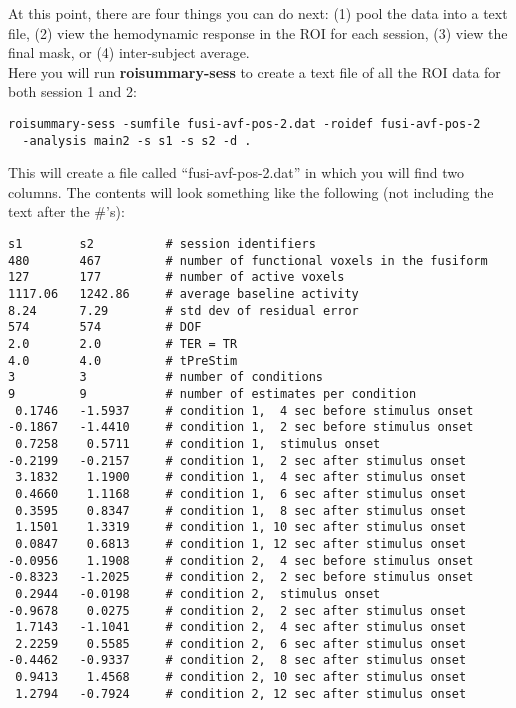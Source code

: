 \documentclass[10pt]{article}
\begin{document}
At this point, there are four things you can do next: (1) pool the
data into a text file, (2) view the hemodynamic response in the ROI
for each session, (3) view the final mask, or (4) inter-subject
average. \\

 Here you will run
{\bf roisummary-sess} to create a text file of all the ROI data for
both session 1 and 2:
\begin{verbatim}
roisummary-sess -sumfile fusi-avf-pos-2.dat -roidef fusi-avf-pos-2 
  -analysis main2 -s s1 -s s2 -d .
\end{verbatim}
This will create a file called ``fusi-avf-pos-2.dat'' in which you
will find two columns.  The contents will look something like the
following (not including the text after the \#'s): 
\begin{verbatim}
s1        s2          # session identifiers
480       467         # number of functional voxels in the fusiform
127       177         # number of active voxels
1117.06   1242.86     # average baseline activity
8.24      7.29        # std dev of residual error
574       574         # DOF
2.0       2.0         # TER = TR
4.0       4.0         # tPreStim
3         3           # number of conditions
9         9           # number of estimates per condition
 0.1746   -1.5937     # condition 1,  4 sec before stimulus onset
-0.1867   -1.4410     # condition 1,  2 sec before stimulus onset
 0.7258    0.5711     # condition 1,  stimulus onset
-0.2199   -0.2157     # condition 1,  2 sec after stimulus onset
 3.1832    1.1900     # condition 1,  4 sec after stimulus onset
 0.4660    1.1168     # condition 1,  6 sec after stimulus onset
 0.3595    0.8347     # condition 1,  8 sec after stimulus onset
 1.1501    1.3319     # condition 1, 10 sec after stimulus onset
 0.0847    0.6813     # condition 1, 12 sec after stimulus onset
-0.0956    1.1908     # condition 2,  4 sec before stimulus onset
-0.8323   -1.2025     # condition 2,  2 sec before stimulus onset
 0.2944   -0.0198     # condition 2,  stimulus onset
-0.9678    0.0275     # condition 2,  2 sec after stimulus onset
 1.7143   -1.1041     # condition 2,  4 sec after stimulus onset
 2.2259    0.5585     # condition 2,  6 sec after stimulus onset
-0.4462   -0.9337     # condition 2,  8 sec after stimulus onset
 0.9413    1.4568     # condition 2, 10 sec after stimulus onset
 1.2794   -0.7924     # condition 2, 12 sec after stimulus onset
\end{verbatim}
\end{document}
